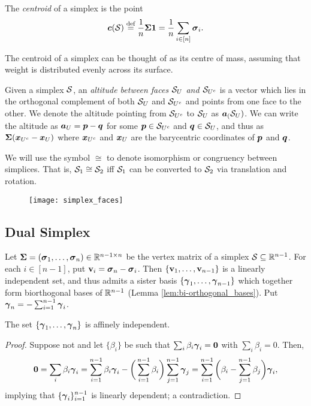 The \emph{centroid} of a simplex is the point 
\begin{equation*}
\vb*{c}(\mathcal{S}) \overset{\text{def}}{=} \frac{1}{n}\boldsymbol{\Sigma} \vb{1} = \frac{1}{n}\sum_{i\in[n]}\vb*{\sigma}_i.
\end{equation*} 

The centroid of a simplex can be thought of as its centre of mass, assuming that weight is distributed evenly across its surface. 

Given a simplex $\mathcal{S}$, an \emph{altitude between faces $\mathcal{S}_U$ and $\mathcal{S}_{U^c}$} is a vector which lies in the orthogonal complement of both $\mathcal{S}_U$ and $\mathcal{S}_{U^c}$ and points from one face to the other. 
We denote the altitude pointing from $\mathcal{S}_{U^c}$ to $\mathcal{S}_{U}$ as $\vb*{a}_(\mathcal{S}_U)$. We can write the altitude as $\vb*{a}_U=\vb*{p}-\vb*{q}$ for some $\vb*{p}\in \mathcal{S}_{U^c}$ and $\vb*{q}\in\mathcal{S}_{U}$, and thus as $\boldsymbol{\Sigma}(\vb*{x}_{U^c}-\vb*{x}_{U})$ where $\vb*{x}_{U^c}$ and $\vb*{x}_{U}$ are the barycentric coordinates of $\vb*{p}$ and $\vb*{q}$. 

We will use the symbol $\cong$ to denote isomorphism or congruency between simplices. That is, $\mathcal{S}_1\cong\mathcal{S}_2$ iff $\mathcal{S}_1$ can be converted to $\mathcal{S}_2$ via translation and rotation.  

\begin{figure}
	\centering
	\texttt{[image: simplex\_faces]}
	\caption{}
	\label{fig:simplex_faces}
\end{figure}




\subsection{Dual Simplex}
\label{sec:dual_simplex}
Let $\boldsymbol{\Sigma}=(\vb*{\sigma}_1,\dots,\vb*{\sigma}_n)\in\mathbb{R}^{n-1\times n}$ be the vertex matrix of a simplex $\mathcal{S}\subseteq\mathbb{R}^{n-1}$. For each $i\in[n-1]$, put $\vb{v}_i=\vb*{\sigma}_n-\vb*{\sigma}_i$. Then $\{\vb{v}_1,\dots,\vb{v}_{n-1}\}$ is a linearly independent set, and thus admits a sister basis $\{\vb*{\gamma}_1,\dots,\vb*{\gamma}_{n-1}\}$ which together form biorthogonal bases of $\mathbb{R}^{n-1}$ (Lemma \ref{lem:bi-orthogonal_bases}). Put $\vb*{\gamma}_n = -\sum_{i=1}^{n-1}\vb*{\gamma}_i$.  

\begin{claim}
The set 
$\{\vb*{\gamma}_1,\dots,\vb*{\gamma}_n\}$ is affinely independent. 
\end{claim}
\begin{proof}
Suppose not and let $\{\beta_i\}$ be such that $\sum_i \beta_i \vb*{\gamma}_i =\vb{0}$ with $\sum_i\beta_i=0$. Then, 
\[\vb{0} = \sum_i\beta_i\vb*{\gamma}_i = \sum_{i=1}^{n-1} \beta_i \vb*{\gamma}_i - \bigg(\sum_{i=1}^{n-1} \beta_i\bigg)\sum_{j=1}^{n-1}\vb*{\gamma}_j = \sum_{i=1}^{n-1}\bigg(\beta_i-\sum_{j=1}^{n-1}\beta_j\bigg)\vb*{\gamma}_i,\]
implying that $\{\vb*{\gamma}_i\}_{i=1}^{n-1}$ is linearly dependent; a contradiction.  
\end{proof}

